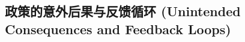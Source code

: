 \documentclass[
  a4paper,
  zihao=-4,
  fontset=mac,
  AutoFakeBold,
  AutoFakeSlant,
  oneside]{ctexbook}
\begin{document}


\subsection{政策的意外后果与反馈循环 (Unintended Consequences and Feedback Loops)}








\end{document}
